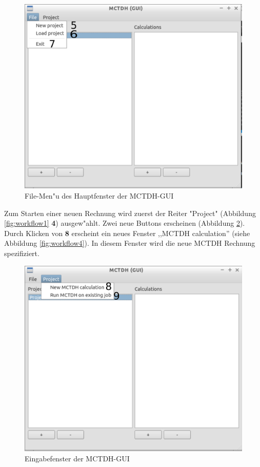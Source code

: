 \begin{figure}
    \centering
    \includegraphics[scale=0.5]{figures/screenMainFile}
    \caption{File-Men"u des Hauptfenster der MCTDH-GUI}\label{fig:workflow2}
\end{figure}

Zum Starten einer neuen Rechnung wird zuerst der Reiter "Project" (Abbildung \ref{fig:workflow1} \textbf{4}) 
ausgew"ahlt. Zwei neue Buttons erscheinen (Abbildung \ref{fig:workflow3}). Durch Klicken von \textbf{8} 
erscheint ein neues Fenster ,,MCTDH calculation'' (siehe Abbildung \ref{fig:workflow4}). 
In diesem Fenster wird die neue MCTDH Rechnung spezifiziert.

\begin{figure}
    \centering
    \includegraphics[scale=0.5]{figures/screenMainProject}
    \caption{Eingabefenster der MCTDH-GUI}\label{fig:workflow3}
\end{figure}

